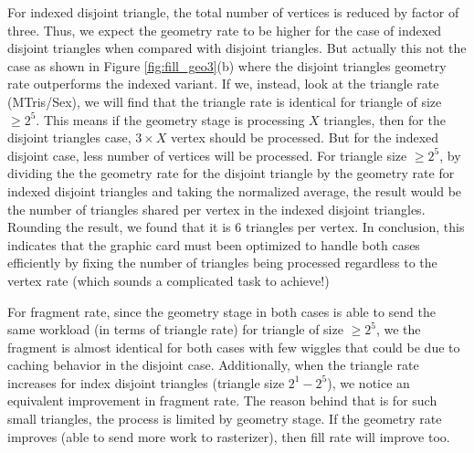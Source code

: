 For indexed disjoint triangle, the total number of vertices is reduced by factor of three. Thus, we expect the geometry rate to be higher for the case of indexed disjoint triangles when compared with disjoint triangles. But actually this not the case as shown in Figure \ref{fig:fill_geo3}(b) where the disjoint triangles geometry rate outperforms the indexed variant. If we, instead, look at the triangle rate (MTris/Sex), we will find that the triangle rate is identical for triangle of size $\geq2^{5}$. This means if the geometry stage is processing $X$ triangles, then for the disjoint triangles case, $3\times X$ vertex should be processed. But for the indexed disjoint case, less number of vertices will be processed. For triangle size $\geq2^{5}$, by dividing the the geometry rate for the disjoint triangle by the geometry rate for indexed disjoint triangles and taking the normalized average, the result would be the number of triangles shared per vertex in the indexed disjoint triangles. Rounding the result, we found that it is 6 triangles per vertex. In conclusion, this indicates that the graphic card must been optimized to handle both cases efficiently by fixing the number of triangles being processed regardless to the vertex rate (which sounds a complicated task to achieve!)

For fragment rate, since the geometry stage in both cases is able to send the same workload (in terms of triangle rate) for triangle of size $\geq 2^{5}$, we the fragment is almost identical for both cases with few wiggles that could be due to caching behavior in the disjoint case. Additionally, when the triangle rate increases for index disjoint triangles (triangle size $2^{1}-2^{5}$), we notice an equivalent improvement in fragment rate. The reason behind that is for such small triangles, the process is limited by geometry stage. If the geometry rate improves (able to send more work to rasterizer), then fill rate will improve too. 

